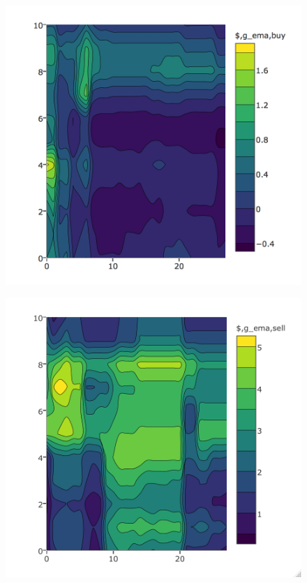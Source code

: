 \documentclass[12pt]{article}
\theoremstyle{definition}
\begin{document}
\begin{figure}[H]
\centering
\begin{minipage}{0.45\textwidth}
\centering
\includegraphics[scale=0.4]{contour3}
  \label{fig:c5}
\end{minipage}
\begin{minipage}{0.45\textwidth}
\centering
\includegraphics[scale=0.4]{contour4}
  \label{fig:c6}
\end{minipage}
\end{figure}
\end{document}
